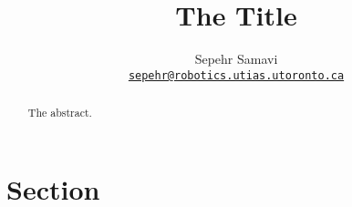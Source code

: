 \documentclass[11pt,letterpaper]{article}
\title{\textbf{The Title}}
\author{Sepehr Samavi%
\\\href{mailto:sepehr@robotics.utias.utoronto.ca}{\tt\small sepehr@robotics.utias.utoronto.ca}
}
\begin{document}
\maketitle
\begin{abstract}
The abstract.
\end{abstract}

\section{Section}

\nocite{*}



\end{document}

